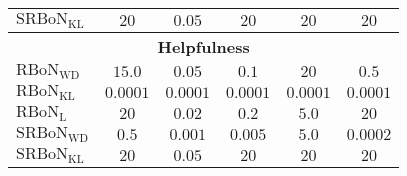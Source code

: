 \begin{table}[tb]
\begin{tabular}{@{}lrrrrr@{}}
\textbf{$\mathrm{SRBoN}_{\mathrm{KL}}$} & \multicolumn{1}{c}{$20$} & \multicolumn{1}{c}{$0.05$} & \multicolumn{1}{c}{$20$} & \multicolumn{1}{c}{$20$} & \multicolumn{1}{c}{$20$} \\
\midrule
\multicolumn{6}{c}{\textbf{Helpfulness}} \\ \midrule
\textbf{$\mathrm{RBoN}_{\mathrm{WD}}$} & \multicolumn{1}{c}{$ 15.0$} & \multicolumn{1}{c}{$0.05$} & \multicolumn{1}{c}{$ 0.1$} & \multicolumn{1}{c}{$20$} & \multicolumn{1}{c}{$0.5$} \\
\textbf{$\mathrm{RBoN}_{\mathrm{KL}}$} & \multicolumn{1}{c}{$0.0001$} & \multicolumn{1}{c}{$0.0001$} & \multicolumn{1}{c}{$ 0.0001$} & \multicolumn{1}{c}{$ 0.0001$} & \multicolumn{1}{c}{$ 0.0001$} \\
\textbf{$\mathrm{RBoN}_{\mathrm{L}}$} & \multicolumn{1}{c}{$20$} & \multicolumn{1}{c}{$0.02$} & \multicolumn{1}{c}{$0.2$} & \multicolumn{1}{c}{$5.0$} & \multicolumn{1}{c}{$20$} \\
\textbf{$\mathrm{SRBoN}_{\mathrm{WD}}$} & \multicolumn{1}{c}{$0.5$} & \multicolumn{1}{c}{$0.001$} & \multicolumn{1}{c}{$0.005$} & \multicolumn{1}{c}{$5.0$} & \multicolumn{1}{c}{$0.0002$} \\
\textbf{$\mathrm{SRBoN}_{\mathrm{KL}}$} & \multicolumn{1}{c}{$20$} & \multicolumn{1}{c}{$0.05$} & \multicolumn{1}{c}{$20$} & \multicolumn{1}{c}{$20$} & \multicolumn{1}{c}{$20$} \\
\bottomrule
\end{tabular}
\label{tab:optimal_beta}
\end{table}
